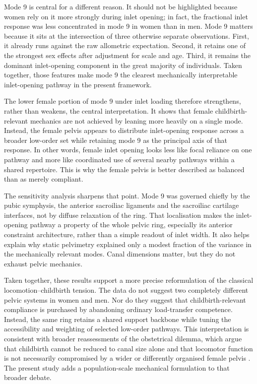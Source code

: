 \documentclass[openacc]{rsproca_new}
\begin{document}
Mode 9 is central for a different reason. It should not be highlighted because women rely on it more strongly during inlet opening; in fact, the fractional inlet response was less concentrated in mode 9 in women than in men. Mode 9 matters because it sits at the intersection of three otherwise separate observations. First, it already runs against the raw allometric expectation. Second, it retains one of the strongest sex effects after adjustment for scale and age. Third, it remains the dominant inlet-opening component in the great majority of individuals. Taken together, those features make mode 9 the clearest mechanically interpretable inlet-opening pathway in the present framework.

The lower female portion of mode 9 under inlet loading therefore strengthens, rather than weakens, the central interpretation. It shows that female childbirth-relevant mechanics are not achieved by leaning more heavily on a single mode. Instead, the female pelvis appears to distribute inlet-opening response across a broader low-order set while retaining mode 9 as the principal axis of that response. In other words, female inlet opening looks less like focal reliance on one pathway and more like coordinated use of several nearby pathways within a shared repertoire. This is why the female pelvis is better described as balanced than as merely compliant.

The sensitivity analysis sharpens that point. Mode 9 was governed chiefly by the pubic symphysis, the anterior sacroiliac ligaments and the sacroiliac cartilage interfaces, not by diffuse relaxation of the ring. That localisation makes the inlet-opening pathway a property of the whole pelvic ring, especially its anterior constraint architecture, rather than a simple readout of inlet width. It also helps explain why static pelvimetry explained only a modest fraction of the variance in the mechanically relevant modes. Canal dimensions matter, but they do not exhaust pelvic mechanics.

Taken together, these results support a more precise reformulation of the classical locomotion--childbirth tension. The data do not suggest two completely different pelvic systems in women and men. Nor do they suggest that childbirth-relevant compliance is purchased by abandoning ordinary load-transfer competence. Instead, the same ring retains a shared support backbone while tuning the accessibility and weighting of selected low-order pathways. This interpretation is consistent with broader reassessments of the obstetrical dilemma, which argue that childbirth cannot be reduced to canal size alone and that locomotor function is not necessarily compromised by a wider or differently organised female pelvis \cite{gru2023,war2015,pav2020,bet2018}. The present study adds a population-scale mechanical formulation to that broader debate.
\end{document}

